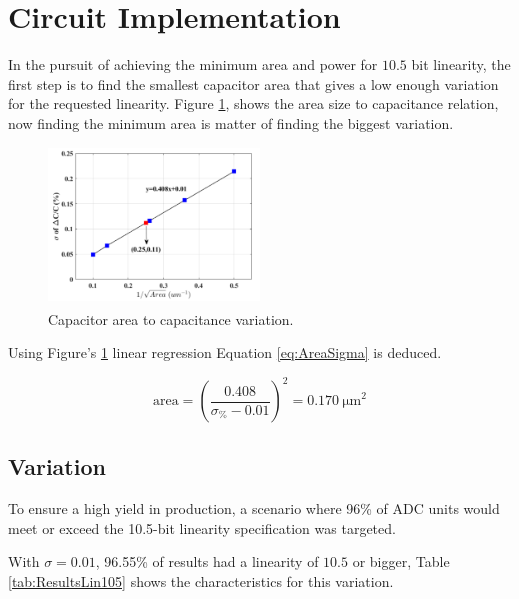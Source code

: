 \section{Circuit Implementation}
\label{sec:implementation}

In the pursuit of achieving the minimum area and power for $10.5$ bit linearity, the first step is to find the smallest capacitor area that gives a low enough variation for the requested linearity. Figure \ref{fig:Csize2sigma}, shows the area size to capacitance relation, now finding the minimum area is matter of finding the biggest variation. 

\begin{figure}[H]

    \centering
    \includegraphics*[width=0.5\textwidth]{Images/Csize2sigma.png}
    \caption{Capacitor area to capacitance variation.\textsuperscript{\cite{paper}}}

    \label{fig:Csize2sigma}
\end{figure}

Using Figure's \ref{fig:Csize2sigma} linear regression Equation \ref{eq:AreaSigma} is deduced.

\begin{equation}
    \text{area} = \left(\frac{0.408}{\sigma_\% - 0.01}\right)^2 = \SI{0.170}{\micro\meter}^2 
    \label{eq:AreaSigma}
\end{equation}

\subsection{Variation}

To ensure a high yield in production, a scenario where 96\% of ADC units would meet or exceed the 10.5-bit linearity specification was targeted. 

With $\sigma = 0.01$, 96.55\% of results had a linearity of $10.5$ or bigger, Table \ref{tab:ResultsLin105} shows the characteristics for this variation.

